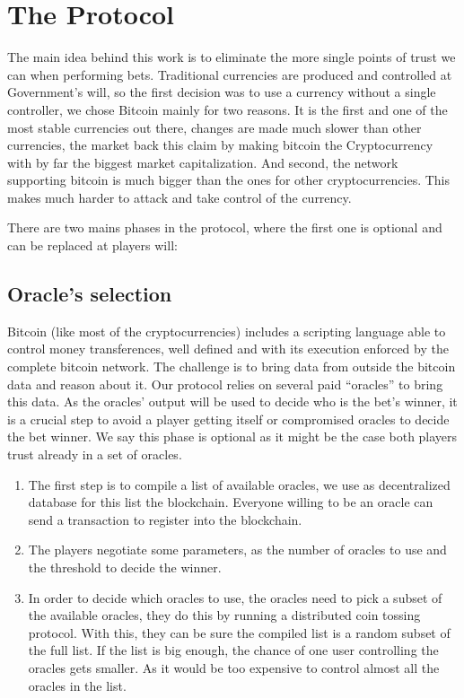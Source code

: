 \section{The Protocol}

The main idea behind this work is to eliminate the more single points of
  trust we can when performing bets. Traditional currencies are produced and
  controlled at Government's will, so the first decision was to use a currency
  without a single controller, we chose Bitcoin mainly for two reasons.
It is the first and one of the most stable currencies out there, changes are
  made much slower than other currencies, the market back this claim by making
  bitcoin the Cryptocurrency with by far the biggest market capitalization.
And second, the network supporting bitcoin is much bigger than the ones for
  other cryptocurrencies. This makes much harder to attack and take control
  of the currency.

There are two mains phases in the protocol, where the first one is optional and
  can be replaced at players will:
\subsection{Oracle's selection}
Bitcoin (like most of the cryptocurrencies) includes a scripting language able
 to control money transferences, well defined and with its execution enforced by
 the complete bitcoin network.
The challenge is to bring data from outside the bitcoin data and reason about
  it. Our protocol relies on several paid ``oracles'' to bring this data.
As the oracles' output will be used to decide who is the bet's winner, it is a
  crucial step to avoid a player getting itself or compromised oracles to decide
  the bet winner.
We say this phase is optional as it might be the case both players trust already
  in a set of oracles.

\begin{enumerate}
  \item The first step is to compile a list of available oracles, we use as
      decentralized database for this list the blockchain. Everyone willing to
      be an oracle can send a transaction to register into the blockchain.
  \item The players negotiate some parameters, as the number of oracles to use
      and the threshold to decide the winner.
  \item In order to decide which oracles to use, the oracles need to pick a
      subset of the available oracles, they do this by running a distributed
      coin tossing protocol.
    With this, they can be sure the compiled list is a random subset of the
      full list. If the list is big enough, the chance of one user controlling
      the oracles gets smaller. As it would be too expensive to control almost
      all the oracles in the list.
\end{enumerate}

